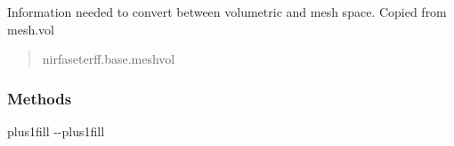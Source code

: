 \documentclass[letterpaper,10pt,english]{sphinxmanual}
\begin{document}
\begin{fulllineitems}
\begin{fulllineitems}
\begin{quote}
\begin{description}
\end{description}\end{quote}

\end{fulllineitems}


\begin{fulllineitems}
\label{\detokenize{_autosummary/nirfasterff.base.data.flTPSFdata:nirfasterff.base.data.flTPSFdata.vol}}
\pysigstartsignatures
\pysigline
{}
\pysigstopsignatures
\sphinxAtStartPar
Information needed to convert between volumetric and mesh space. Copied from mesh.vol
\begin{quote}\begin{description}
\sphinxAtStartPar
nirfaseterff.base.meshvol

\end{description}\end{quote}

\end{fulllineitems}


\begin{fulllineitems}
\label{\detokenize{_autosummary/nirfasterff.base.data.flTPSFdata:nirfasterff.base.data.flTPSFdata.__init__}}
\pysigstartsignatures
\pysiglinewithargsret
{}
{}
{}
\pysigstopsignatures
\end{fulllineitems}

\subsubsection*{Methods}


\begin{savenotes}
\sphinxatlongtablestart
\sphinxthistablewithglobalstyle
\sphinxthistablewithnovlinesstyle
\makeatletter
  \LTleft \@totalleftmargin plus1fill
  \LTright\dimexpr\columnwidth-\@totalleftmargin-\linewidth\relax plus1fill
\makeatother
\begin{longtable}{}
\sphinxtoprule
\endfirsthead

\\
\sphinxtoprule
\endhead


\end{longtable}
\end{savenotes}
\end{fulllineitems}
\end{document}
